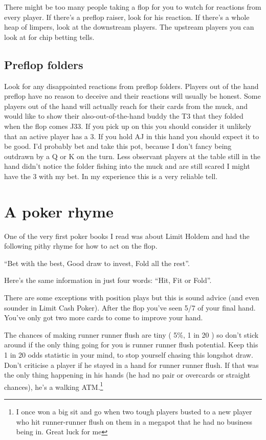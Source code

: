 There might be too many people taking a flop for you to watch for
reactions from every player. If there's a preflop raiser, look
for his reaction. If there's a whole heap of limpers,
look at the downstream players. The upstream players you can look at
for chip betting tells.

\subsection{Preflop folders}

Look for any disappointed reactions from preflop folders. Players
out of the hand preflop have no reason to deceive and their
reactions will usually be honest. Some players out of the hand
will actually reach for their cards from the muck, and would like
to show their also-out-of-the-hand buddy the T3 that they folded
when the flop comes J33. If you pick up on this you should consider
it unlikely that an active player has a 3. If you hold AJ in this
hand you should expect it to be good. I'd probably bet and take this
pot, because I don't fancy being outdrawn by a Q or K on the turn.
Less observant players at the table still in the hand didn't notice
the folder fishing into the muck and are still scared I might
have the 3 with my bet. In my experience this is a very reliable tell.

\section{A poker rhyme}

One of the very first poker books I read was about Limit Holdem and
had the following pithy rhyme for how to act on the flop.

``Bet with the best, Good draw to invest, Fold all the rest''.


Here's the same information in just four words: ``Hit, Fit or Fold''.

There are some exceptions with position plays but this is sound
advice (and even sounder in Limit Cash Poker). After the flop
you've seen 5/7 of your final hand. You've only got two
more cards to come to improve your hand.

The chances of making runner runner flush are tiny ( 5\%, 1 in 20 )
so don't stick around if the only thing going for you is runner
runner flush potential. Keep this 1 in 20 odds statistic in your
mind, to stop yourself chasing this longshot draw.
Don't criticise a player if he stayed in a hand for runner
runner flush. If that was the only thing happening in his hands
(he had no pair or overcards or straight chances), he's a walking
ATM.\footnote{I once won a big sit and go when two tough players
busted to a new player who hit runner-runner flush on them
in a megapot that he had no business being in. Great luck for me}

